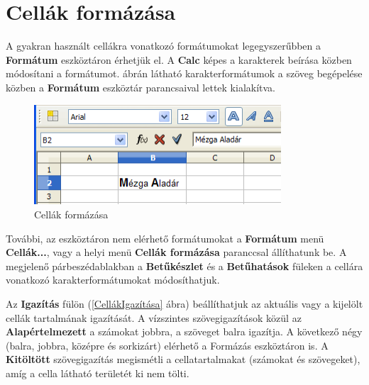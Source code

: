 \section{Cellák formázása}

A gyakran használt cellákra vonatkozó formátumokat
legegyszerűbben a \textbf{Formátum} eszköztáron érhetjük
el. A \textbf{Calc} képes a karakterek beírása közben
módosítani a formátumot.  ábrán látható
karakterformátumok a szöveg begépelése közben a
\textbf{Formátum} eszköztár parancsaival lettek kialakítva.

\begin{figure}[!h]
\begin{center}
\includegraphics[width=9.206cm]{oocalcv1-img11.png}
\caption{Cellák formázása}\label{CellákFormázása}
\end{center}
\end{figure}

További, az eszköztáron nem elérhető formátumokat a
\textbf{Formátum} menü \textbf{Cellák...}, vagy a helyi menü
\textbf{Cellák formázása} paranccsal állíthatunk be. A
megjelenő párbeszédablakban a \textbf{Betűkészlet} és a
\textbf{Betűhatások} füleken a cellára vonatkozó
karakterformátumokat módosíthatjuk. 

Az \textbf{Igazítás} fülön (\ref{CellákIgazítása} ábra) beállíthatjuk az
aktuális vagy a kijelölt cellák tartalmának igazítását. A
vízszintes szövegigazítások közül az
\textbf{Alapértelmezett} a számokat jobbra, a szöveget balra
igazítja. A következő négy (balra, jobbra, középre és
sorkizárt) elérhető a Formázás eszköztáron is. A
\textbf{Kitöltött} szövegigazítás megismétli a
cellatartalmakat (számokat és szövegeket), amíg a cella
látható területét ki nem tölti.

